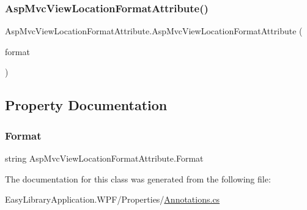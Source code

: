 \subsubsection{\texorpdfstring{Asp\+Mvc\+View\+Location\+Format\+Attribute()}{AspMvcViewLocationFormatAttribute()}}
{\footnotesize\ttfamily Asp\+Mvc\+View\+Location\+Format\+Attribute.\+Asp\+Mvc\+View\+Location\+Format\+Attribute (\begin{DoxyParamCaption}\item[{\mbox{[}\+Not\+Null\mbox{]} string}]{format }\end{DoxyParamCaption})}



\subsection{Property Documentation}
\mbox{\label{class_asp_mvc_view_location_format_attribute_a3489b3971df02310fd8abb286247c4ae}} 
\subsubsection{\texorpdfstring{Format}{Format}}
{\footnotesize\ttfamily string Asp\+Mvc\+View\+Location\+Format\+Attribute.\+Format\hspace{0.3cm}{\ttfamily [get]}}



The documentation for this class was generated from the following file\+:\begin{DoxyCompactItemize}
\item 
Easy\+Library\+Application.\+W\+P\+F/\+Properties/\mbox{\hyperlink{_annotations_8cs}{Annotations.\+cs}}\end{DoxyCompactItemize}
